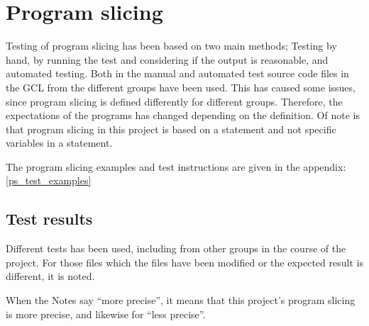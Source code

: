 \section{Program slicing}

Testing of program slicing has been based on two main methods;
Testing by hand, by running the test and considering if the output
is reasonable, and automated testing. Both in the manual and automated
test source code files in the GCL from the different groups have been
used. This has caused some issues, since program slicing is defined
differently for different groups. Therefore, the expectations of the
programs has changed depending on the definition.
Of note is that program slicing in this project is based on a statement
and not specific variables in a statement.

The program slicing examples and test instructions are given in the 
appendix: \ref{ps_test_examples}

\subsection{Test results}

Different tests has been used, including from other groups in the course
of the project. For those files which the files have been modified or the
expected result is different, it is noted.

When the Notes say ``more precise'', it means that this project's program
slicing is more precise, and likewise for ``less precise''.

